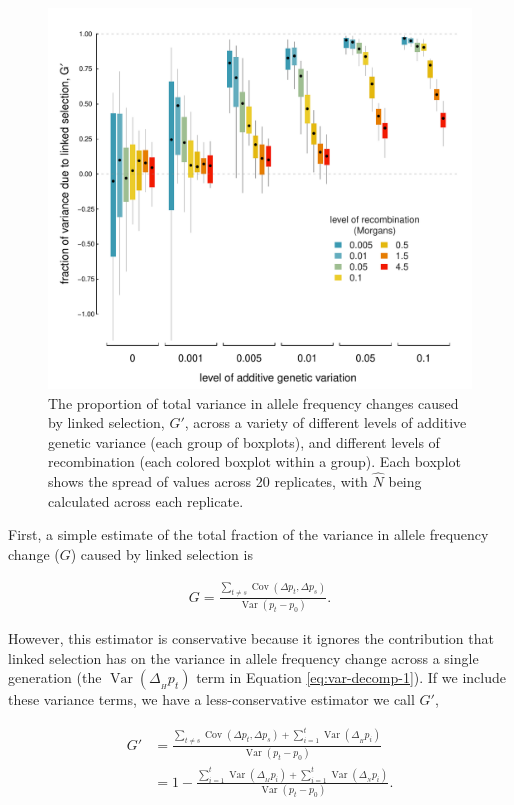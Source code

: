 \documentclass[11pt]{article}
\DeclareMathOperator{\var}{Var}
\DeclareMathOperator{\cov}{Cov}
\begin{document}
\begin{figure}
  \centering
  \includegraphics{./images/estimate-gp.pdf} 

  \caption{The proportion of total variance in allele frequency changes caused
    by linked selection, $G'$, across a variety of different levels of additive
    genetic variance (each group of boxplots), and different levels of
    recombination (each colored boxplot within a group). Each boxplot shows the
  spread of values across 20 replicates, with $\widehat{N}$ being calculated
across each replicate.} 

  \label{fig:est-g}
\end{figure}

First, a simple estimate of the total fraction of the variance in allele
frequency change ($G$) caused by linked selection is

\begin{align}
  G = \frac{\sum_{t \ne s}\cov(\Delta p_t, \Delta p_s)}{\var(p_t - p_0)}.
\end{align}

However, this estimator is conservative because it ignores the contribution
that linked selection has on the variance in allele frequency change across a
single generation (the $\var(\Delta_{_H} p_t)$ term in Equation
\ref{eq:var-decomp-1}). If we include these variance terms, we have a
less-conservative estimator we call $G'$,

\begin{align}
  G' &= \frac{\sum_{t \ne s}\cov(\Delta p_t, \Delta p_s) + \sum_{i=1}^t \var(\Delta_{_H} p_i)}{\var(p_t - p_0)} \nonumber \\
     &= 1 - \frac{\sum_{i=1}^t \var(\Delta_{_M} p_i) + \sum_{i=1}^t \var( \Delta_{_N} p_i)}{\var(p_t - p_0)}.
  \label{eq:g-prime}
\end{align}
\end{document}
